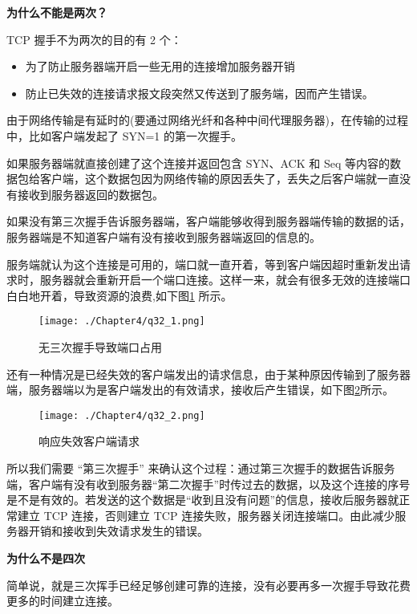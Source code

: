 \documentclass[cn,11pt,color=blue,lang=cn]{elegantbook}
\begin{document}
\begin{solution}
\begin{note} \textbf{为什么不能是两次？} \end{note}
TCP 握手不为两次的目的有 2 个：
\begin{itemize}
	\item 为了防止服务器端开启一些无用的连接增加服务器开销
	\item 防止已失效的连接请求报文段突然又传送到了服务端，因而产生错误。
\end{itemize}

由于网络传输是有延时的(要通过网络光纤和各种中间代理服务器)，在传输的过程中，比如客户端发起了 SYN=1 的第一次握手。

如果服务器端就直接创建了这个连接并返回包含 SYN、ACK 和 Seq 等内容的数据包给客户端，这个数据包因为网络传输的原因丢失了，丢失之后客户端就一直没有接收到服务器返回的数据包。

如果没有第三次握手告诉服务器端，客户端能够收得到服务器端传输的数据的话，服务器端是不知道客户端有没有接收到服务器端返回的信息的。

服务端就认为这个连接是可用的，端口就一直开着，等到客户端因超时重新发出请求时，服务器就会重新开启一个端口连接。这样一来，就会有很多无效的连接端口白白地开着，导致资源的浪费,如下图\ref{fig32_1} 所示。
\begin{figure}[htbp]
\centering
\texttt{[image: ./Chapter4/q32\_1.png]}
\caption{无三次握手导致端口占用}
\label{fig32_1}
\end{figure}
还有一种情况是已经失效的客户端发出的请求信息，由于某种原因传输到了服务器端，服务器端以为是客户端发出的有效请求，接收后产生错误，如下图\ref{fig32_2}所示。

\begin{figure}[!h]
\centering
\texttt{[image: ./Chapter4/q32\_2.png]}
\caption{响应失效客户端请求}
\label{fig32_2}
\end{figure}

所以我们需要 “第三次握手” 来确认这个过程：通过第三次握手的数据告诉服务端，客户端有没有收到服务器“第二次握手”时传过去的数据，以及这个连接的序号是不是有效的。若发送的这个数据是“收到且没有问题”的信息，接收后服务器就正常建立 TCP 连接，否则建立 TCP 连接失败，服务器关闭连接端口。由此减少服务器开销和接收到失效请求发生的错误。
\newpage
\begin{note} \textbf{为什么不是四次} \end{note}
简单说，就是三次挥手已经足够创建可靠的连接，没有必要再多一次握手导致花费更多的时间建立连接。
\end{solution}
\end{document}
